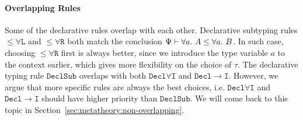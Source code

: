 \paragraph{Overlapping Rules}
Some of the declarative rules overlap with each other.
Declarative subtyping rules $\mathtt{{\le}\forall L}$ and $\mathtt{{\le}\forall R}$
both match the conclusion $\Psi\vdash \all A \le \all B$.
In such case, choosing $\mathtt{{\le}\forall R}$ first is always better,
since we introduce the type variable $a$ to the context earlier,
which gives more flexibility on the choice of $\tau$.
The declarative typing rule $\mathtt{DeclSub}$ overlaps with
both $\mathtt{Decl\forall I}$ and $\mathtt{Decl{\to}I}$.
However, we argue that more specific rules are always the best choices,
i.e. $\mathtt{Decl\forall I}$ and $\mathtt{Decl{\to}I}$ should have
higher priority than $\mathtt{DeclSub}$. We will come back to this
topic in Section~\ref{sec:metatheory:non-overlapping}.
\begin{comment}
For example, $\Psi\vdash \lam x \Lto \all a\to a$ succeeds if derived from
Rule $\mathtt{Decl\forall I}$, but fails when applied to $\mathtt{DeclSub}$:
$$
\inferrule*[right={$\mathtt{Decl\forall I}$}]
	{\inferrule*[Right={$\mathtt{Decl\to I}$}]
		{\Psi,a,x:a \vdash x \Lto a}
		{\Psi,a \vdash \lam x \Lto a \to a}
	}
	{\Psi\vdash \lam x \Lto \all a \to a}
$$
$$
\inferrule*[right={$\mathtt{DeclSub}$}]
	{
		\inferrule*[right=$\mathtt{Decl\to I\To}$]
			{\Psi \vdash \blue\sigma\to \blue\tau \quad \Psi,x:\blue\sigma\vdash e \Lto \blue\tau}
			{\Psi \vdash \lam x \To \blue\sigma\to \blue\tau}\quad
		\inferrule*[Right=$\mathtt{{\le}\forall R}$]
			{\inferrule*[Right=$\mathtt{{\le}{\to}}$]
				{
					\inferrule*[Right=$?$]
						{\text{Impossible! }\blue\sigma \neq a}
						{\Psi,a \vdash a \le \blue\sigma}
					\quad \Psi,a \vdash \blue\tau \le a
				}
				{\Psi,a \vdash \blue\sigma\to \blue\tau \le a \to a}
			}
			{\Psi\vdash \blue\sigma\to \blue\tau\le \all a \to a}
	}
{\Psi\vdash \lam x \Lto \all a \to a}
$$

Rule $\mathtt{Decl\to I}$ is also better at handling higher-order types.
When the lambda-expression to be inferred has a polymorphic input type,
such as $\all a \to a$,
$\mathtt{DeclSub}$ may not derive some judgments.
For example, $\Psi,id:\all a\to a \vdash \lam[f] f~id~(f~()) \Lto (\all a\to a) \to 1$
requires the argument of the lambda-expression to be a polymorphic type,
otherwise it could not be applied to both $id$ and $()$.
If Rule $\mathtt{DeclSub}$ was chosen for derivation,
the type of its argument is restricted by Rule $\mathtt{Decl\to I\To}$,
which is not a polymorphic type.
By contrast,
Rule $\mathtt{Decl\to I}$ keeps the polymorphic argument type $\all a\to a$,
and will successfully derive the judgment.
\end{comment}

